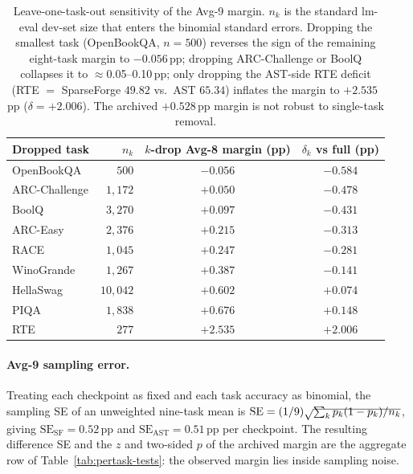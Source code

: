 \documentclass{article}
\begin{document}
\begin{table}[h]\centering\small\setlength{\tabcolsep}{5pt}
\caption{Leave-one-task-out sensitivity of the Avg-9 margin. $n_k$ is the
standard lm-eval dev-set size that enters the binomial standard errors.
Dropping the smallest task (OpenBookQA, $n{=}500$) reverses the sign of the
remaining eight-task margin to $-0.056$\,pp; dropping ARC-Challenge or BoolQ
collapses it to $\approx$0.05--0.10\,pp; only dropping the AST-side RTE deficit
(RTE $=$ SparseForge $49.82$ vs.\ AST $65.34$) inflates the margin to
$+2.535$\,pp ($\delta{=}{+}2.006$). The archived $+0.528$\,pp margin is not robust
to single-task removal.}
\label{tab:loo}
\begin{tabular}{lrcc}
\toprule
Dropped task & $n_k$ & $k$-drop Avg-8 margin (pp) & $\delta_k$ vs full (pp) \\
\midrule
OpenBookQA & $500$ & $-0.056$ & $-0.584$ \\
ARC-Challenge & $1{,}172$ & $+0.050$ & $-0.478$ \\
BoolQ & $3{,}270$ & $+0.097$ & $-0.431$ \\
ARC-Easy & $2{,}376$ & $+0.215$ & $-0.313$ \\
RACE & $1{,}045$ & $+0.247$ & $-0.281$ \\
WinoGrande & $1{,}267$ & $+0.387$ & $-0.141$ \\
HellaSwag & $10{,}042$ & $+0.602$ & $+0.074$ \\
PIQA & $1{,}838$ & $+0.676$ & $+0.148$ \\
RTE & $277$ & $+2.535$ & $+2.006$ \\
\bottomrule
\end{tabular}
\end{table}

\paragraph{Avg-9 sampling error.}
Treating each checkpoint as fixed and each task accuracy as binomial, the
sampling SE of an unweighted nine-task mean is
$\mathrm{SE}=(1/9)\sqrt{\smash{\sum_k p_k(1-p_k)/n_k}}$, giving
$\mathrm{SE}_\mathrm{SF}=0.52$\,pp and $\mathrm{SE}_\mathrm{AST}=0.51$\,pp
per checkpoint. The resulting difference SE and the $z$ and two-sided $p$ of the
archived margin are the aggregate row of Table~\ref{tab:pertask-tests}: the
observed margin lies inside sampling noise.
\end{document}
